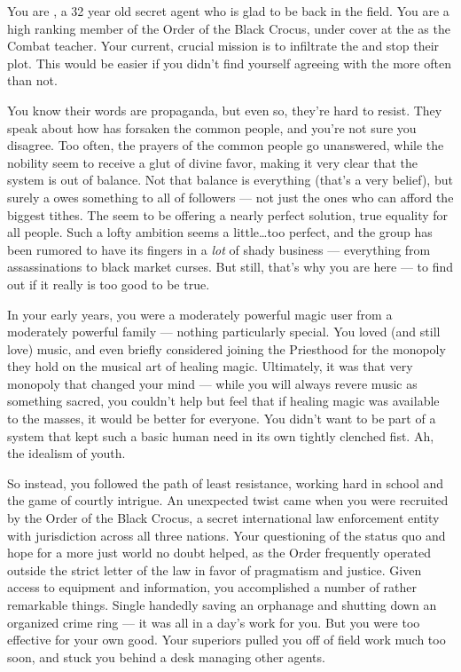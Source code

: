 \documentclass[char]{GL2020}
\begin{document}
\name{\cInterpol{}}

You are \cInterpol{\intro}, a 32 year old secret agent who is glad to be back in the field. You are a high ranking member of the Order of the Black Crocus, under cover at the \pSchool{} as the Combat teacher. Your current, crucial mission is to infiltrate the \pGoaties{} and stop their plot. This would be easier if you didn't find yourself agreeing with the \pGoaties{} more often than not.

You know their words are propaganda, but even so, they're hard to resist. They speak about how \cFarmGod{} has forsaken the common people, and you're not sure you disagree. Too often, the prayers of the common people go unanswered, while the nobility seem to receive a glut of divine favor, making it very clear that the system is out of balance. Not that balance is everything (that's a very \pShippie{} belief), but surely a \cFarmGod{\God} owes something to all of \cFarmGod{\their} followers — not just the ones who can afford the biggest tithes. The \pGoaties{} seem to be offering a nearly perfect solution, true equality for all people. Such a lofty ambition seems a little\ldots{}too perfect, and the group has been rumored to have its fingers in a \emph{lot} of shady business — everything from assassinations to black market curses. But still, that's why you are here — to find out if it really is too good to be true.

In your early years, you were a moderately powerful magic user from a moderately powerful family — nothing particularly special. You loved (and still love) music, and even briefly considered joining the Priesthood for the monopoly they hold on the musical art of healing magic. Ultimately, it was that very monopoly that changed your mind — while you will always revere music as something sacred, you couldn't help but feel that if healing magic was available to the masses, it would be better for everyone. You didn't want to be part of a system that kept such a basic human need in its own tightly clenched fist. Ah, the idealism of youth. 

So instead, you followed the path of least resistance, working hard in school and the game of courtly intrigue. An unexpected twist came when you were recruited by the Order of the Black Crocus, a secret international law enforcement entity with jurisdiction across all three nations. Your questioning of the status quo and hope for a more just world no doubt helped, as the Order frequently operated outside the strict letter of the law in favor of pragmatism and justice. Given access to equipment and information, you accomplished a number of rather remarkable things. Single handedly saving an orphanage and shutting down an organized crime ring — it was all in a day's work for you. But you were too effective for your own good. Your superiors pulled you off of field work much too soon, and stuck you behind a desk managing other agents.
\end{document}
